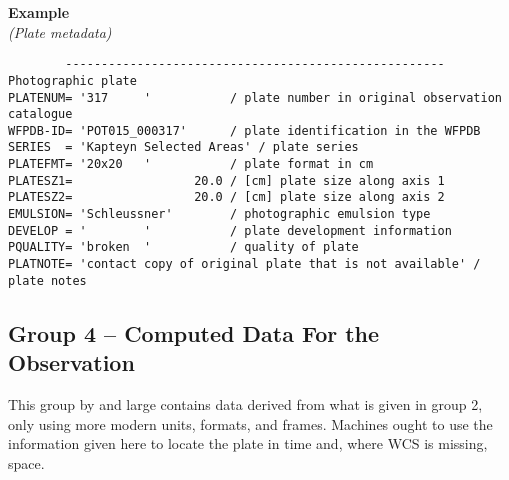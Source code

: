 \documentclass[11pt]{ivoa}
\newenvironment{fitsexample}[1]
{\bigskip\noindent\textbf{Example}\\\textit{(#1\smallskip)}}
{\medskip}
\begin{document}
\begin{fitsexample}{Plate metadata}
\begin{lstlisting}
        ----------------------------------------------------- Photographic plate
PLATENUM= '317     '           / plate number in original observation catalogue
WFPDB-ID= 'POT015_000317'      / plate identification in the WFPDB
SERIES  = 'Kapteyn Selected Areas' / plate series
PLATEFMT= '20x20   '           / plate format in cm
PLATESZ1=                 20.0 / [cm] plate size along axis 1
PLATESZ2=                 20.0 / [cm] plate size along axis 2
EMULSION= 'Schleussner'        / photographic emulsion type
DEVELOP = '        '           / plate development information
PQUALITY= 'broken  '           / quality of plate
PLATNOTE= 'contact copy of original plate that is not available' / plate notes
\end{lstlisting}
\end{fitsexample}

\subsection{Group 4 – Computed Data For the Observation}

This group by and large contains data derived from what is given in
group 2, only using more modern units, formats, and frames.  Machines
ought to use the information given here to locate the plate in time and,
where WCS is missing, space.
\end{document}
